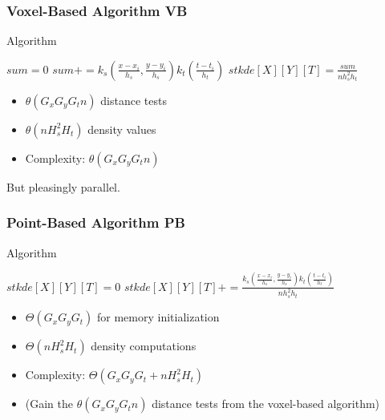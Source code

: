 \documentclass{beamer}
\begin{document}
\begin{frame}[fragile]
  \frametitle{Voxel-Based Algorithm \textsc{VB}}

  \begin{block}{Algorithm}
    \begin{algorithmic}
      \State $sum = 0$
      \State $sum += k_s(\frac{x-x_i}{h_s},\frac{y-y_i}{h_s}) k_t(\frac{t-t_i}{h_t})$
      \EndIf
      \EndFor
      \State $stkde[X][Y][T] = \frac{sum}{n h_s^2h_t}$
      \EndFor
    \end{algorithmic}
  \end{block}

  \begin{itemize}
  \item $\theta(G_x G_y G_t n)$ distance tests
  \item $\theta(n H_s^2 H_t )$ density values
  \item Complexity: $\theta(G_x G_y G_t n )$
  \end{itemize}

  But pleasingly parallel.    
\end{frame}

\begin{frame}
  \frametitle{Point-Based Algorithm \textsc{PB}}
  
  \begin{block}{Algorithm}
    \begin{algorithmic}
        \State $stkde[X][Y][T] = 0$
      \EndFor
                \State $stkde[X][Y][T] += \frac{k_s(\frac{x-x_i}{h_s},\frac{y-y_i}{h_s}) k_t(\frac{t-t_i}{h_t})}{n h_s^2h_t}$
              \EndIf
            \EndFor
          \EndFor
        \EndFor
      \EndFor
    \end{algorithmic}
  \end{block}
    
  \begin{itemize}
  \item $\Theta(G_x G_y G_t)$ for memory initialization
  \item $\Theta(n H_s^2 H_t)$ density computations
  \item Complexity:  $\Theta(G_x G_y G_t + n H_s^2 H_t)$
  \item (Gain the $\theta(G_x G_y G_t n)$ distance tests from the voxel-based algorithm)
  \end{itemize}
\end{frame}
\end{document}
